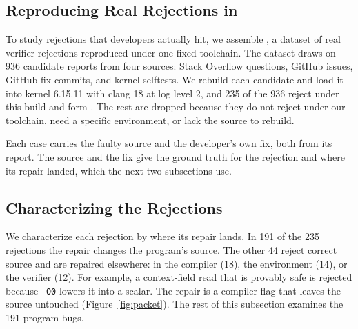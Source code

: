 

\subsection{Reproducing Real Rejections in \empiricalset}
\label{sec:study:corpus}

To study rejections that developers actually hit, we assemble \empiricalset, a dataset of real verifier rejections reproduced under one fixed toolchain.
The dataset draws on 936 candidate reports from four sources: Stack Overflow questions, GitHub issues, GitHub fix commits, and kernel selftests.
We rebuild each candidate and load it into kernel 6.15.11 with clang 18 at log level 2, and 235 of the 936 reject under this build and form \empiricalset.
The rest are dropped because they do not reject under our toolchain, need a specific environment, or lack the source to rebuild.

Each \empiricalset case carries the faulty source and the developer's own fix, both from its report.
The source and the fix give the ground truth for the rejection and where its repair landed, which the next two subsections use.

\subsection{Characterizing the Rejections}
\label{sec:study:bugs}

We characterize each \empiricalset rejection by where its repair lands.
In 191 of the 235 rejections the repair changes the program's source.
The other 44 reject correct source and are repaired elsewhere: in the compiler (18), the environment (14), or the verifier (12).
For example, a context-field read that is provably safe is rejected because \texttt{-O0} lowers it into a scalar.
The repair is a compiler flag that leaves the source untouched (Figure~\ref{fig:packet}).
The rest of this subsection examines the 191 program bugs.



